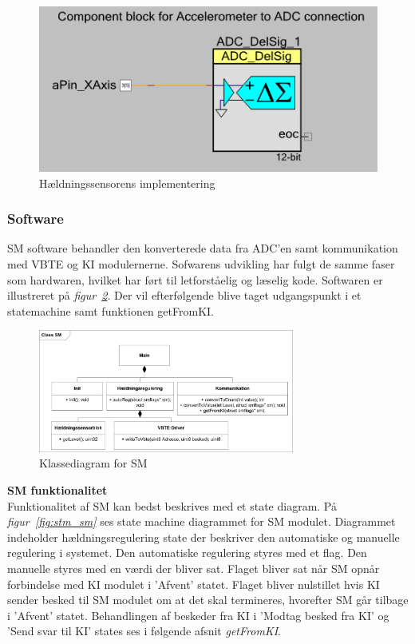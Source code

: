\begin{figure}[htbp]
	\centering
	\includegraphics[scale=0.8]{billeder/levelsensor}
	\caption{Hældningssensorens implementering}
	\label{fig:levelsensor}
\end{figure}
\subsubsection{Software}
SM software behandler den konverterede data fra ADC'en samt kommunikation med VBTE og KI modulernerne. Sofwarens udvikling har fulgt de samme faser som hardwaren, hvilket har ført til letforståelig og læselig kode. Softwaren er illustreret på \textit{figur~\ref{fig:SMKD}}. Der vil efterfølgende blive taget udgangspunkt i et statemachine samt funktionen getFromKI.
\begin{figure}[H]
	\centering
	\includegraphics[width=0.75\textwidth]{billeder/smKlassediagram}
	\caption{Klassediagram for SM}
	\label{fig:SMKD}
\end{figure}
\textbf{SM funktionalitet}\\
Funktionalitet af SM kan bedst beskrives med et state diagram. På \textit{figur~\ref{fig:stm_sm}} ses  state machine diagrammet for SM modulet. Diagrammet indeholder hældningsregulering state der beskriver den automatiske og manuelle regulering i systemet. Den automatiske regulering styres med et flag. Den manuelle styres med en værdi der bliver sat. Flaget bliver sat når SM opnår forbindelse med KI modulet i 'Afvent' statet. Flaget bliver nulstillet hvis KI sender besked til SM modulet om at det skal termineres, hvorefter SM går tilbage i 'Afvent' statet. Behandlingen af beskeder fra KI i 'Modtag besked fra KI' og 'Send svar til KI' states ses i følgende afsnit \textit{getFromKI}.\\

